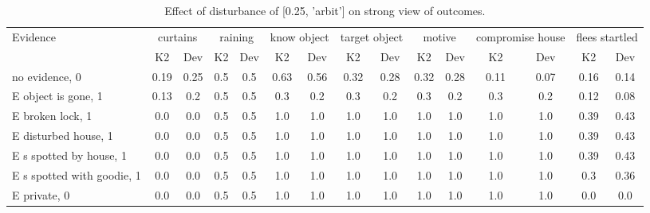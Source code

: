 \begin{table}\begin{tabular}{l|cc|cc|cc|cc|cc|cc|cc}\toprule\multirow{2}{*}{Evidence} & \multicolumn{2}{c}{curtains}& \multicolumn{2}{c}{raining}& \multicolumn{2}{c}{know object}& \multicolumn{2}{c}{target object}& \multicolumn{2}{c}{motive}& \multicolumn{2}{c}{compromise house}& \multicolumn{2}{c}{flees startled}\\& {K2} & {Dev}& {K2} & {Dev}& {K2} & {Dev}& {K2} & {Dev}& {K2} & {Dev}& {K2} & {Dev}& {K2} & {Dev}\\\midrule
no evidence, 0 & \cellcolor{Bittersweet}0.19&\cellcolor{Bittersweet}0.25&0.5&0.5&\cellcolor{Bittersweet}0.63&\cellcolor{Bittersweet}0.56&0.32&0.28&0.32&0.28&0.11&0.07&0.16&0.14\\E object is gone, 1 & \cellcolor{Bittersweet}0.13&\cellcolor{Bittersweet}0.2&0.5&0.5&\cellcolor{Bittersweet}0.3&\cellcolor{Bittersweet}0.2&\cellcolor{Bittersweet}0.3&\cellcolor{Bittersweet}0.2&\cellcolor{Bittersweet}0.3&\cellcolor{Bittersweet}0.2&\cellcolor{Bittersweet}0.3&\cellcolor{Bittersweet}0.2&0.12&0.08\\E broken lock, 1 & 0.0&0.0&0.5&0.5&1.0&1.0&1.0&1.0&1.0&1.0&1.0&1.0&0.39&0.43\\E disturbed house, 1 & 0.0&0.0&0.5&0.5&1.0&1.0&1.0&1.0&1.0&1.0&1.0&1.0&0.39&0.43\\E s spotted by house, 1 & 0.0&0.0&0.5&0.5&1.0&1.0&1.0&1.0&1.0&1.0&1.0&1.0&0.39&0.43\\E s spotted with goodie, 1 & 0.0&0.0&0.5&0.5&1.0&1.0&1.0&1.0&1.0&1.0&1.0&1.0&\cellcolor{Bittersweet}0.3&\cellcolor{Bittersweet}0.36\\E private, 0 & 0.0&0.0&0.5&0.5&1.0&1.0&1.0&1.0&1.0&1.0&1.0&1.0&0.0&0.0\\\bottomrule\end{tabular}\caption{Effect of disturbance of [0.25, 'arbit'] on strong view of outcomes.}\end{table}